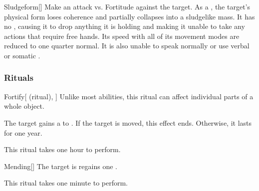 \lowercase{\hypertarget{spell:Sludgeform}{}}\label{spell:Sludgeform}
\begin{freeability}[Rank 8]{\hypertarget{spell:Sludgeform}{Sludgeform}}[]
Make an attack vs. Fortitude against the target.
\hit As a , the target's physical form loses coherence and partially collapses into a sludgelike mass.
It has no , causing it to drop anything it is holding and making it unable to take any actions that require free hands.
Its speed with all of its  movement modes are reduced to one quarter normal.
It is also unable to speak normally or use verbal or somatic .
\end{freeability}
\vspace{0.25em}



\subsubsection{Rituals}


\lowercase{\hypertarget{spell:Fortify}{}}\label{spell:Fortify}
\begin{attuneability}[Rank 1]{\hypertarget{spell:Fortify}{Fortify}}[ (ritual), ]
Unlike most abilities, this ritual can affect individual parts of a whole object.

The target gains a   to .
If the target is moved, this effect ends.
Otherwise, it lasts for one year.

This ritual takes one hour to perform.
\end{attuneability}
\vspace{0.25em}



\lowercase{\hypertarget{spell:Mending}{}}\label{spell:Mending}
\begin{apability}[Rank 1]{\hypertarget{spell:Mending}{Mending}}[]
The target is regains one .

This ritual takes one minute to perform.
\end{apability}
\vspace{0.25em}



